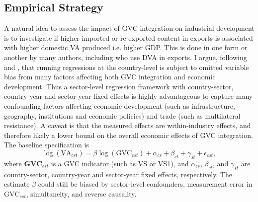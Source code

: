 \documentclass[a4paper]{article}
\begin{document}
 
 

\newpage









\subsection{Empirical Strategy}


A natural idea to assess the impact of GVC integration on industrial development is to investigate if higher imported or re-exported content in exports is associated with higher domestic VA produced i.e. higher GDP. This is done in one form or another by many authors, including \citet{lwesya2022integration} who use DVA in exports. I argue, following \citet{Kummritz20161} and \citet{rodriguez2000trade}, that running regressions at the country-level is subject to omitted variable bias from many factors affecting both GVC integration and economic development. Thus a sector-level regression framework with country-sector, country-year and sector-year fixed effects is highly advantageous to capture many confounding factors affecting economic development (such as infrastructure, geography, institutions and economic policies) and trade (such as multilateral resistance). A caveat is that the measured effects are within-industry effects, and therefore likely a lower bound on the overall economic effects of GVC integration. The baseline specification is 
\begin{equation} \label{eq:VA_HDFE}
\log(\text{VA}_{cst}) = \beta \log(\text{GVC}_{cst}) + \alpha_{cs} + \beta_{ct} +\gamma_{st} + \epsilon_{cst},
\end{equation}
where $\textbf{GVC}_{cst}$ is a GVC indicator (such as VS or VS1), and 
$\alpha_{cs}$, $\beta_{ct}$, and $\gamma_{st}$ are country-sector, country-year and sector-year fixed effects, respectively. The estimate $\beta$ could still be biased by sector-level confounders, measurement error in $\text{GVC}_{cst}$, simultaneity, and reverse causality.  \newline
\end{document}
